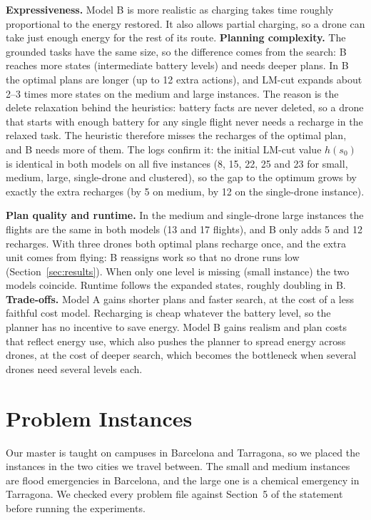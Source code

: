 \documentclass[11pt,a4paper]{article}
\begin{document}
  \textbf{Expressiveness.} Model B is more realistic as charging takes
    time roughly proportional to the energy restored. It also allows partial charging, so a drone can take just
    enough energy for the rest of its route. \textbf{Planning complexity.} The grounded tasks have the same size,
    so the difference comes from the search: B reaches more states
    (intermediate battery levels) and needs deeper plans. In B the optimal plans are longer
    (up to 12 extra actions), and LM-cut expands about 2--3 times more states on the medium and large instances. The reason is the delete relaxation behind the heuristics: battery facts are never deleted, so a drone that starts with enough battery for any single flight never needs a recharge in the relaxed task. The heuristic therefore misses the recharges of the optimal plan, and B needs more of them. The logs confirm it: the initial LM-cut value $h(s_0)$ is identical in both models on all five instances (8, 15, 22, 25 and 23 for small, medium, large, single-drone and clustered), so the gap to the optimum grows by exactly the extra recharges (by 5 on medium, by 12 on the single-drone instance).
    
    \textbf{Plan quality and runtime.} In the medium and single-drone large
    instances the flights are the same in both models (13 and 17 flights), and B only
    adds 5 and 12 recharges. With three drones both optimal plans recharge
    once, and the extra unit comes from flying: B reassigns work so that no
    drone runs low (Section~\ref{sec:results}). When only one level is missing (small instance) the two
    models coincide. Runtime follows the expanded states, roughly doubling
    in B. \textbf{Trade-offs.} Model A gains shorter plans and faster search, at
    the cost of a less faithful cost model. Recharging is cheap whatever the
    battery level, so the planner has no incentive to save energy. Model B
    gains realism and plan costs that reflect energy use, which also pushes
    the planner to spread energy across drones, at the cost of deeper
    search, which becomes the bottleneck when several drones need several
    levels each.


\section{Problem Instances}
\label{sec:instances}

Our master is taught on campuses in Barcelona and Tarragona, so we placed the
instances in the two cities we travel between. The small and medium instances
are flood emergencies in Barcelona, and the large one is a chemical emergency
in Tarragona. We checked every problem file against Section~5 of the
statement before running the experiments.
\end{document}
